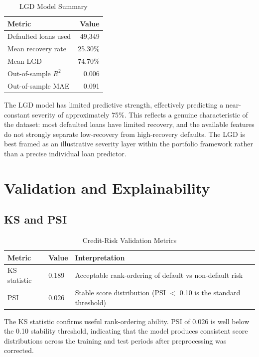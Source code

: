 \documentclass[12pt]{article}
\begin{document}
\begin{table}[H]
\centering
\caption{LGD Model Summary}
\begin{tabular}{lr}
\toprule
Metric & Value \\
\midrule
Defaulted loans used & 49,349 \\
Mean recovery rate & 25.30\% \\
Mean LGD & 74.70\% \\
Out-of-sample $R^2$ & 0.006 \\
Out-of-sample MAE & 0.091 \\
\bottomrule
\end{tabular}
\end{table}

The LGD model has limited predictive strength, effectively predicting a near-constant severity of approximately 75\%. This reflects a genuine characteristic of the dataset: most defaulted loans have limited recovery, and the available features do not strongly separate low-recovery from high-recovery defaults. The LGD is best framed as an illustrative severity layer within the portfolio framework rather than a precise individual loan predictor.

\section{Validation and Explainability}

\subsection{KS and PSI}

\begin{table}[H]
\centering
\caption{Credit-Risk Validation Metrics}
\begin{tabular}{lll}
\toprule
Metric & Value & Interpretation \\
\midrule
KS statistic & 0.189 & Acceptable rank-ordering of default vs non-default risk \\
PSI & 0.026 & Stable score distribution (PSI $<$ 0.10 is the standard threshold) \\
\bottomrule
\end{tabular}
\end{table}

The KS statistic confirms useful rank-ordering ability. PSI of 0.026 is well below the 0.10 stability threshold, indicating that the model produces consistent score distributions across the training and test periods after preprocessing was corrected.
\end{document}
